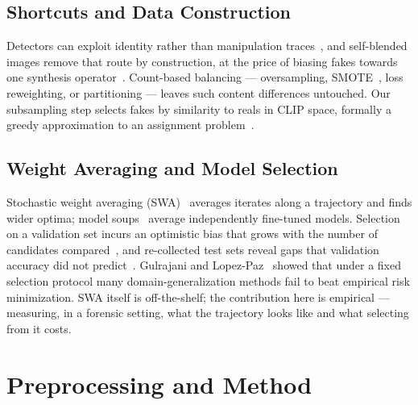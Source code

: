 \documentclass[10pt,journal]{IEEEtran}
\begin{document}
\subsection{Shortcuts and Data Construction}
Detectors can exploit identity rather than manipulation
traces~\cite{dong2023identityleakage}, and self-blended images remove that
route by construction, at the price of biasing fakes towards one synthesis
operator~\cite{shiohara2022sbi}. Count-based balancing --- oversampling,
SMOTE~\cite{chawla2002smote}, loss reweighting, or partitioning --- leaves such
content differences untouched. Our subsampling step selects fakes by similarity
to reals in CLIP space, formally a greedy approximation to an assignment
problem~\cite{kuhn1955hungarian,burkard2012assignment}.

\subsection{Weight Averaging and Model Selection}
Stochastic weight averaging (SWA)~\cite{izmailov2018swa} averages iterates along
a trajectory and finds wider optima; model soups~\cite{wortsman2022soups}
average independently fine-tuned models. Selection on a validation set incurs
an optimistic bias that grows with the number of candidates
compared~\cite{cawley2010overfitting,varma2006bias}, and re-collected test sets
reveal gaps that validation accuracy did not
predict~\cite{recht2019imagenet}. Gulrajani and
Lopez-Paz~\cite{gulrajani2021lostdg} showed that under a fixed selection
protocol many domain-generalization methods fail to beat empirical risk
minimization. SWA itself is off-the-shelf; the contribution here is empirical
--- measuring, in a forensic setting, what the trajectory looks like and what
selecting from it costs.

\section{Preprocessing and Method}\label{sec:method}
\end{document}
